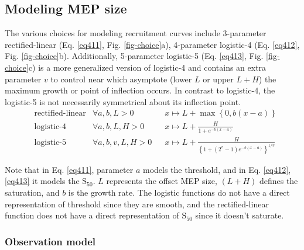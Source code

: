 \documentclass[pdflatex,sn-mathphys-ay]{sn-jnl}%
\numberwithin{equation}{subsection}
\theoremstyle{thmstyleone}%
\theoremstyle{thmstyletwo}%
\theoremstyle{thmstylethree}%
\begin{document}
\subsection{Modeling MEP size}\label{modeling}
The various choices for modeling recruitment curves include 3-parameter rectified-linear \cite{willer_hypoxia_1987,devanne_input-output_1997,malone_closed-loop_2022-1,mcintosh_intraoperative_2023} (Eq. \ref{eq411}, Fig. \ref{fig-choice}a), 4-parameter logistic-4 \cite{devanne_input-output_1997,kukke_efficient_2014} (Eq. \ref{eq412}, Fig. \ref{fig-choice}b). Additionally, 5-parameter logistic-5 \cite{pitcher_age_2003} (Eq. \ref{eq413}, Fig. \ref{fig-choice}c) is a more generalized version of logistic-4 and contains an extra parameter $v$ to control near which asymptote (lower $L$ or upper $L + H$) the maximum growth or point of inflection occurs. In contrast to logistic-4, the logistic-5 is not necessarily symmetrical about its inflection point.
\begin{align}
    &\text{rectified-linear} & \forall a, b, L > 0\ \;\;&x \mapsto L + \max\left\{0, b\left(x - a\right)\right\}  \label{eq411}\\
    &\text{logistic-4} & \forall a, b, L, H > 0\ \;\;&x \mapsto L + \frac{H}{1 + e^{-b\left(x-a\right)}}  \label{eq412}\\
    &\text{logistic-5} & \forall a, b, v, L, H > 0\ \;\;&x \mapsto L + \frac{H}{\left\{1 + \left(2^v - 1\right)e^{-b\left(x-a\right)}\right\}^{1/v}}  \label{eq413}
\end{align}

Note that in Eq. \ref{eq411}, parameter $a$ models the threshold, and in Eq. \ref{eq412}, \ref{eq413} it models the $\text{S}_{50}$. $L$ represents the offset MEP size, $\left(L + H\right)$ defines the saturation, and $b$ is the growth rate. The logistic functions do not have a direct representation of threshold since they are smooth, and the rectified-linear function does not have a direct representation of $\text{S}_{50}$ since it doesn’t saturate.

\subsubsection{Observation model}
\end{document}
